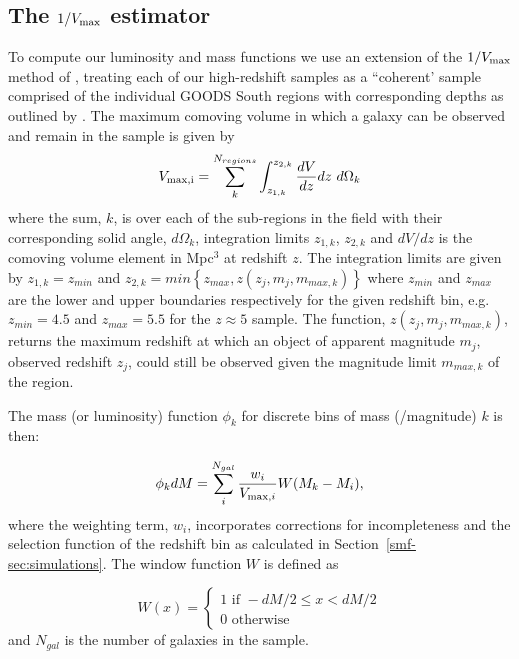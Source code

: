 \subsection{The $1/V_{\rm{max}}$ estimator}\label{subsmf-sec:vmax}
To compute our luminosity and mass functions we use an extension of the $1/V_{\rm{max}}$ method of \citet{Schmidt:1968wj}, treating each of our high-redshift samples as a ``coherent' sample comprised of the individual GOODS South regions with corresponding depths as outlined by \citet{1980ApJ...235..694A,1993ApJ...404...51E,2005A&A...439..863I}. The maximum comoving volume in which a galaxy can be observed and remain in the sample is given by
\begin{equation}
V_{\rm{max},i} =  \sum_{k}^{N_{regions}} \int_{z_{1,k}}^{z_{2,k}} \frac{dV}{dz} dz~d\Omega_{k}
\end{equation}
where the sum, $k$, is over each of the sub-regions in the field with their corresponding solid angle, $d\Omega_{k}$, integration limits $z_{1,k}$, $z_{2,k}$ and $dV/dz$ is the comoving volume element in Mpc$^{3}$ at redshift $z$.
The integration limits are given by $z_{1,k} = z_{min}$ and $z_{2,k} = min \left \{z_{max},z(z_{j},m_{j},m_{max,k}) \right \}$ where $z_{min}$ and $z_{max}$ are the lower and upper boundaries respectively for the given redshift bin, e.g. $z_{min} = 4.5$ and $z_{max} = 5.5$ for the $z\approx5$ sample. The function, $z(z_{j},m_{j},m_{max,k})$, returns the maximum redshift at which an object of apparent magnitude $m_{j}$, observed redshift $z_{j}$, could still be observed given the magnitude limit $m_{max,k}$ of the region.

The mass (or luminosity) function $\phi_{k}$ for discrete bins of mass (/magnitude) $k$ is then:

\begin{equation}\label{eq:vmaxmethod}
\phi_{k}dM = \sum_{i}^{N_{gal}} \frac{w_{i}}{V_{\textup{max},i}}W(M_{k}-M_{i}),
\end{equation}
where the weighting term, $w_{i}$, incorporates corrections for incompleteness and the selection function of the redshift bin as calculated in Section~\ref{smf-sec:simulations}. The window function $W$ is defined as

\begin{equation}
W(x) = 
\begin{cases}
 1 \text{ if } -dM/2 \leq x < dM/2 \\ 
 0 \text{ otherwise }
\end{cases} 
\end{equation}
and $N_{gal}$ is the number of galaxies in the sample.

